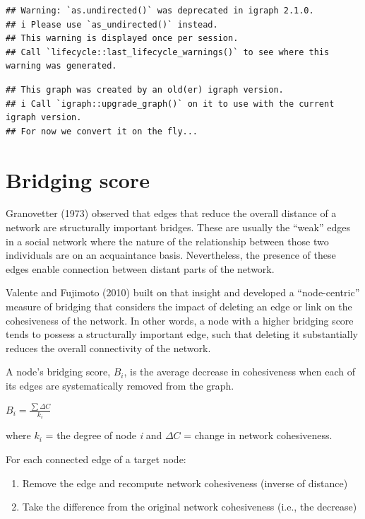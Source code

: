 \documentclass[
]{book}
\providecommand{\tightlist}{%
  \setlength{\itemsep}{0pt}\setlength{\parskip}{0pt}}
\begin{document}
\begin{verbatim}
## Warning: `as.undirected()` was deprecated in igraph 2.1.0.
## i Please use `as_undirected()` instead.
## This warning is displayed once per session.
## Call `lifecycle::last_lifecycle_warnings()` to see where this warning was generated.
\end{verbatim}

\begin{verbatim}
## This graph was created by an old(er) igraph version.
## i Call `igraph::upgrade_graph()` on it to use with the current igraph version.
## For now we convert it on the fly...
\end{verbatim}

\section{Bridging score}\label{bridging-score}

Granovetter (1973) observed that edges that reduce the overall distance of a network are structurally important bridges. These are usually the ``weak'' edges in a social network where the nature of the relationship between those two individuals are on an acquaintance basis. Nevertheless, the presence of these edges enable connection between distant parts of the network.

Valente and Fujimoto (2010) built on that insight and developed a ``node-centric'' measure of bridging that considers the impact of deleting an edge or link on the cohesiveness of the network. In other words, a node with a higher bridging score tends to possess a structurally important edge, such that deleting it substantially reduces the overall connectivity of the network.

A node's bridging score, \(B_i\), is the average decrease in cohesiveness when each of its edges are systematically removed from the graph.

\(B_i=\frac{∑ΔC}{k_i}\)

where \(k_i\) = the degree of node \emph{i} and \(ΔC\) = change in network cohesiveness.

For each connected edge of a target node:

\begin{enumerate}
\def\labelenumi{\arabic{enumi}.}
\tightlist
\item
  Remove the edge and recompute network cohesiveness (inverse of distance)
\item
  Take the difference from the original network cohesiveness (i.e., the decrease)
\end{enumerate}
\end{document}

